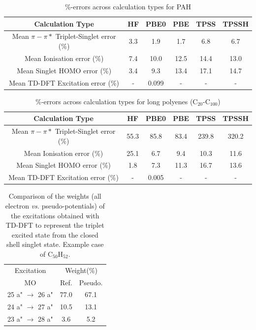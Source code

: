\documentclass[12pt]{article}
\begin{document}
\begin{table}[h]
\caption{\%-errors across calculation types for PAH}
\begin{tabular}{c c c c c c }
\hline
Calculation Type & HF & PBE0 & PBE & TPSS & TPSSH \\
\hline
Mean \(\pi - \pi*\) Triplet-Singlet error (\%) & 3.3 & 1.9 & 1.7 & 6.8 & 6.7 \\
Mean Ionisation error (\%) & 7.4 & 10.0 & 12.5 & 14.4 & 13.0 \\
Mean Singlet HOMO error (\%) & 3.4  & 9.3  & 13.4 & 17.1 & 14.7 \\
Mean TD-DFT Excitation error (\%) & - & 0.099 & - & - & - \\ 
\hline
\end{tabular}
\label{table:ring_system_errors}
\end{table}

\newpage

\begin{table}[h]
\caption{\%-errors across calculation types for long polyenes (C\(_{20}\)-C\(_{100}\))}
\begin{tabular}{c c c c c c }
\hline
Calculation Type & HF & PBE0 & PBE & TPSS & TPSSH \\
\hline
Mean \(\pi - \pi*\) Triplet-Singlet error (\%) & 55.3 & 85.8 & 83.4 & 239.8 & 320.2 \\
Mean Ionisation error (\%) & 25.1 & 6.7 & 9.4 & 10.3 & 11.6 \\
Mean Singlet HOMO error (\%) & 1.8 & 7.3 & 11.3 & 16.7 & 13.6 \\
Mean TD-DFT Excitation error (\%) & - & 0.005 & - & - & - \\ 
\hline
\end{tabular}
\label{table:long_alkene_errors}
\end{table}

\newpage

\begin{table}
\caption{\label{tab:coef}Comparison of the weights (all electron \emph{vs.} pseudo-potentials)
of the excitations obtained with TD-DFT
to represent the triplet excited state from the closed shell singlet state.
Example case of C$_{50}$H$_{52}$.}
\begin{tabular}{c c c c}
\hline
\multicolumn{2}{c}{Excitation} & \multicolumn{2}{c}{Weight(\%)}\\
\multicolumn{2}{c}{MO} & Ref. & Pseudo.\\
\hline
\multicolumn{2}{c}{25 a" \(\rightarrow\) 26 a"} & 77.0 &   67.1  \\
\multicolumn{2}{c}{24 a" \(\rightarrow\) 27 a"} & 10.5 &   13.1  \\
\multicolumn{2}{c}{23 a" \(\rightarrow\) 28 a"} & 3.6  &    5.2  \\
\hline
\end{tabular}
\end{table}
\end{document}

